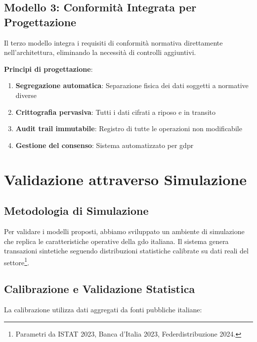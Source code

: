 \subsection{Modello 3: Conformità Integrata per Progettazione}
\label{subsec:compliance-by-design}

Il terzo modello integra i requisiti di conformità normativa direttamente nell'architettura, eliminando la necessità di controlli aggiuntivi.

\textbf{Principi di progettazione}:
\begin{enumerate}
    \item \textbf{Segregazione automatica}: Separazione fisica dei dati soggetti a normative diverse
    \item \textbf{Crittografia pervasiva}: Tutti i dati cifrati a riposo e in transito
    \item \textbf{Audit trail immutabile}: Registro di tutte le operazioni non modificabile
    \item \textbf{Gestione del consenso}: Sistema automatizzato per \gls{gdpr}
\end{enumerate}

\section{Validazione attraverso Simulazione}
\label{sec:validazione-digital-twin}

\subsection{Metodologia di Simulazione}
\label{subsec:metodologia-simulazione}

Per validare i modelli proposti, abbiamo sviluppato un ambiente di simulazione che replica le caratteristiche operative della \gls{gdo} italiana. Il sistema genera transazioni sintetiche seguendo distribuzioni statistiche calibrate su dati reali del settore\footnote{Parametri da ISTAT 2023, Banca d'Italia 2023, Federdistribuzione 2024.}.

\subsection{Calibrazione e Validazione Statistica}
\label{subsec:calibrazione}

La calibrazione utilizza dati aggregati da fonti pubbliche italiane:

